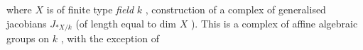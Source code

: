    where $X$ is of finite type   \textit{field} $k$ , construction 
of a complex of generalised jacobians $J_{*X/k}$ (of length equal to dim $X$ ).
This is a complex of affine algebraic groups on $k$ , with the exception of

